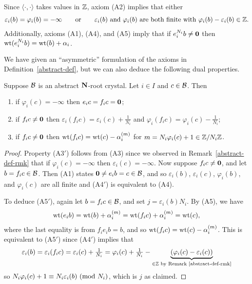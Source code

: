 \documentclass[11pt]{article}
\begin{document}
\begin{remark}\label{abstract-def-rmk}
Since  $\langle\cdot,\cdot \rangle$  takes values in $\mathbb{Z}$, axiom (A2) implies that either 
\[
\text{$\varepsilon_i(b)=\varphi_i(b)=-\infty$}
\qquad\text{or}\qquad
 \text{$\varepsilon_i(b)$ and $\varphi_i(b)$ are both finite with $\varphi_i(b) - \varepsilon_i(b) \in \mathbb{Z}$.}
 \]
Additionally, axioms  (A1), (A4), and (A5) imply that if
 $e_i^{N_i} b \neq \boldsymbol{0}$ 
then  $\operatorname{wt}(e_i^{N_i} b) = \operatorname{wt}(b) + \alpha_i$.
\end{remark}


We have given an ``asymmetric'' formulation of the axioms in Definition~\ref{abstract-def}, but we can also deduce the following dual properties.

\begin{proposition}\label{prime-prop}
Suppose $\mathcal{B}$ is an abstract $\mathbf{N}$-root crystal.
Let $i \in I$ and $c \in \mathcal{B}$.
 Then 
\begin{enumerate}
\item[(A3$'$)] if $\varphi_i(c) = -\infty$ then $e_i c = f_i c = \boldsymbol{0}$;
\item[(A4$'$)] if $f_i c \neq \boldsymbol{0}$ then $\varepsilon_i(f_i c) = \varepsilon_i(c) + \frac{1}{N_i}$ and $\varphi_i(f_i c) = \varphi_i(c) - \frac{1}{N_i}$;
\item[(A5$'$)] if $f_i c \neq \boldsymbol{0}$ then $\operatorname{wt}(f_i c) = \operatorname{wt}(c) - \alpha_i^{(m)}$ for $m = N_i \varphi_i(c) +1 \in \mathbb{Z}/N_i\mathbb{Z}$.
\end{enumerate}
\end{proposition}

\begin{proof}
Property (A3$'$) follows from (A3) since we observed in Remark~\ref{abstract-def-rmk} that if $\varphi_i(c) = -\infty$ then $\varepsilon_i(c)=-\infty$.
Now suppose $ f_i c \neq \boldsymbol{0}$, and let $b = f_ic \in\mathcal{B}$. 
Then (A1) states $\boldsymbol{0} \neq e_i b = c \in \mathcal{B}$, and so $\varepsilon_i(b)$, $\varepsilon_i(c)$, $\varphi_i(b)$, and $\varphi_i(c)$ are all finite
and (A4$'$) is equivalent to (A4).

To deduce (A5$'$), again let $b = f_i c \in \mathcal{B}$, and set $j = \varepsilon_i(b)N_i$.
By (A5), we have
\[
\operatorname{wt}(e_i b) = \operatorname{wt}(b) + \alpha_i^{(m)} = \operatorname{wt}(f_i c) + \alpha_i^{(m)} = \operatorname{wt}(c),
\]
where the last equality is from $f_i e_i b = b$, and so $\operatorname{wt}(f_i c) = \operatorname{wt}(c) - \alpha_i^{(m)}$.
This is equivalent to (A5$'$) since  (A4$'$) implies that
\[
\varepsilon_i(b)=\varepsilon_i(f_ic) = \varepsilon_i(c) + \tfrac{1}{N_i} = \varphi_i(c) + \tfrac{1}{N_i} - \underbrace{(\varphi_i(c) - \varepsilon_i(c))}_{\in\mathbb{Z}\text{ by Remark~\ref{abstract-def-rmk}}}
\]
so $N_i\varphi_i(c) + 1 \equiv N_i\varepsilon_i(b) \ (\mathrm{mod}\  N_i)$, which is $j$ as claimed.
\end{proof}
\end{document}
